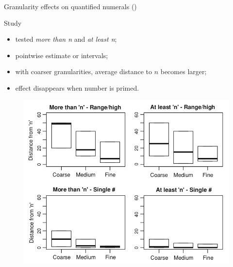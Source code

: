 \documentclass[xcolor=table, hyperref={pdfpagelabels=false}]{beamer}
\begin{document}
\begin{frame}{Granularity effects on quantified numerals \small (\cite{Cummins2012})}
\begin{minipage}{.4\textwidth}
	\begin{block}{Study}
	\begin{itemize}
		\item tested \textit{more than n} and \textit{at least n};
		\item pointwise estimate or intervals;
		\item with coarser granularities, average distance to $n$ becomes larger;
		\item effect disappears when number is primed.
	\end{itemize}
\end{block}
\end{minipage}\quad
\begin{minipage}{.55\textwidth}
	\begin{figure}
	\includegraphics[width=\textwidth]{./images/cummins_data.png}
\end{figure}
\end{minipage}

\end{frame}
\end{document}
